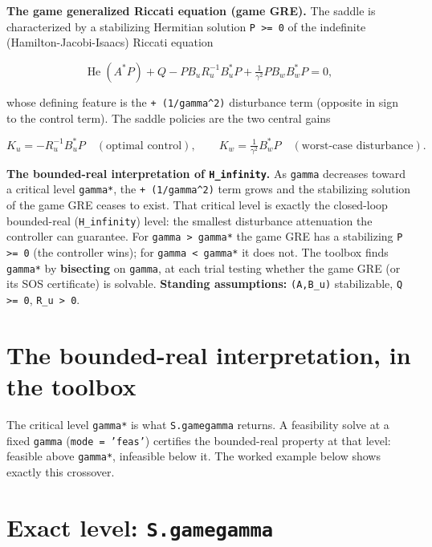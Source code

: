 \documentclass[11pt,oneside]{report}
\newcommand{\code}[1]{\texttt{#1}}
\begin{document}
\textbf{The game generalized Riccati equation (game GRE).} The saddle is
characterized by a stabilizing Hermitian solution \code{P \textgreater{}= 0} of the indefinite
(Hamilton-Jacobi-Isaacs) Riccati equation

\[
\operatorname{He}(A^{*}P) + Q
   - P B_u R_u^{-1} B_u^{*} P
   + \tfrac{1}{\gamma^2}  P B_w B_w^{*} P = 0 ,
\]

whose defining feature is the \code{+ (1/gamma\^{}2)} disturbance term (opposite in sign
to the control term). The saddle policies are the two central gains

\[
K_u = -R_u^{-1} B_u^{*} P \quad (\text{optimal control}),
\qquad
K_w = \tfrac{1}{\gamma^2} B_w^{*} P \quad (\text{worst-case disturbance}).
\]

\textbf{The bounded-real interpretation of \code{H\_infinity}.} As \code{gamma} decreases toward a
critical level \code{gamma*}, the \code{+ (1/gamma\^{}2)} term grows and the stabilizing
solution of the game GRE ceases to exist. That critical level is exactly the
closed-loop bounded-real (\code{H\_infinity}) level: the smallest disturbance
attenuation the controller can guarantee. For \code{gamma \textgreater{} gamma*} the game GRE has
a stabilizing \code{P \textgreater{}= 0} (the controller wins); for \code{gamma \textless{} gamma*} it does not.
The toolbox finds \code{gamma*} by \textbf{bisecting} on \code{gamma}, at each trial testing
whether the game GRE (or its SOS certificate) is solvable. \textbf{Standing
assumptions:} \code{(A,B\_u)} stabilizable, \code{Q \textgreater{}= 0}, \code{R\_u \textgreater{} 0}.

\hypertarget{the-bounded-real-interpretation-in-the-toolbox}{%
\section{The bounded-real interpretation, in the toolbox}\label{the-bounded-real-interpretation-in-the-toolbox}}

The critical level \code{gamma*} is what \code{S.gamegamma} returns. A feasibility solve
at a fixed \code{gamma} (\code{mode = 'feas'}) certifies the bounded-real property at that
level: feasible above \code{gamma*}, infeasible below it. The worked example below
shows exactly this crossover.

\hypertarget{exact-level-s.gamegamma}{%
\section{\texorpdfstring{Exact level: \code{S.gamegamma}}{Exact level: S.gamegamma}}\label{exact-level-s.gamegamma}}
\end{document}
